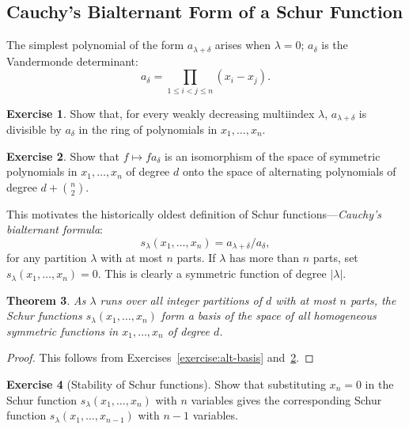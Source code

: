 \documentclass[11pt]{amsart}
\newtheorem{theorem}{Theorem}[subsection]
\theoremstyle{definition}
\theoremstyle{example}
\newtheorem{exercise}[theorem]{Exercise}
\begin{document}
\subsection{Cauchy's Bialternant Form of a Schur Function}
\label{sec:cauchys-bialt-form}
The simplest polynomial of the form $a_{\lambda+\delta}$ arises when $\lambda=0$; $a_\delta$ is the Vandermonde determinant:
\begin{displaymath}
  a_\delta = \prod_{1\leq i<j\leq n}(x_i-x_j).
\end{displaymath}
\begin{exercise}
  Show that, for every weakly decreasing multiindex $\lambda$, $a_{\lambda+\delta}$ is divisible by $a_\delta$ in the ring of polynomials in $x_1,\dotsc,x_n$.
\end{exercise}
\begin{exercise}
  \label{exercise:vandermonde-iso}
  Show that $f\mapsto fa_\delta$ is an isomorphism of the space of symmetric polynomials in $x_1,\dotsc, x_n$ of degree $d$ onto the space of alternating polynomials of degree $d + \binom n2$.
\end{exercise}
This motivates the historically oldest definition of Schur functions---\emph{Cauchy's bialternant formula}:
\begin{equation}
  \label{eq:schur}
  s_\lambda(x_1,\dotsc,x_n) = a_{\lambda+\delta}/a_\delta,
\end{equation}
for any partition $\lambda$ with at most $n$ parts.
If $\lambda$ has more than $n$ parts, set $s_\lambda(x_1,\dotsc,x_n) =0$.
This is clearly a symmetric function of degree $|\lambda|$.
\begin{theorem}
  As $\lambda$ runs over all integer partitions of $d$ with at most $n$ parts, the Schur functions $s_\lambda(x_1,\dotsc,x_n)$ form a basis of the space of all homogeneous symmetric functions in $x_1,\dotsc,x_n$ of degree $d$.
\end{theorem}
\begin{proof}
  This follows from Exercises~\ref{exercise:alt-basis} and~\ref{exercise:vandermonde-iso}.
\end{proof}
\begin{exercise}
  [Stability of Schur functions]
  Show that substituting $x_n=0$ in the Schur function $s_\lambda(x_1,\dotsc, x_n)$ with $n$ variables gives the corresponding Schur function $s_\lambda(x_1,\dotsc,x_{n-1})$ with $n-1$ variables.
\end{exercise}
\end{document}
